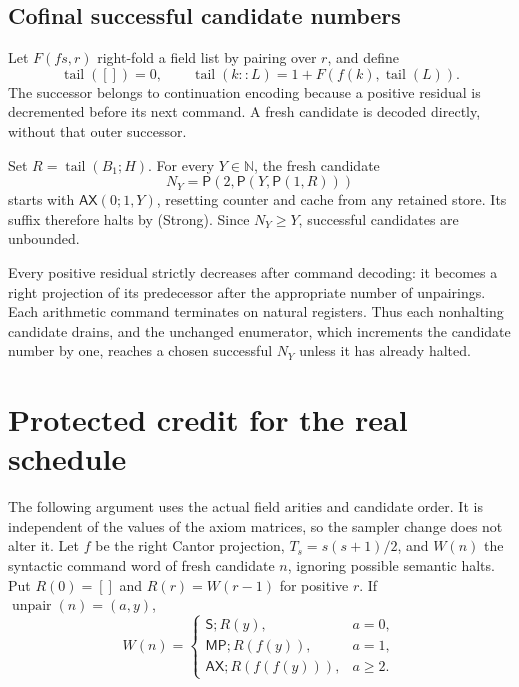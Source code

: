 \documentclass[11pt,a4paper]{article}
\theoremstyle{definition}
\newcommand{\N}{\mathbb N}
\newcommand{\pair}{\mathsf P}
\newcommand{\AX}{\mathsf{AX}}
\newcommand{\MP}{\mathsf{MP}}
\newcommand{\Tr}{\mathsf S}
\numberwithin{equation}{section}
\begin{document}
\subsection{Cofinal successful candidate numbers}

Let $F(fs,r)$ right-fold a field list by pairing over $r$, and define
\[
 \operatorname{tail}([])=0,\qquad
 \operatorname{tail}(k::L)=1+F(f(k),\operatorname{tail}(L)).
\]
The successor belongs to continuation encoding because a positive
residual is decremented before its next command. A fresh candidate is
decoded directly, without that outer successor.

Set $R=\operatorname{tail}(B_1;H)$. For every $Y\in\N$, the fresh
candidate
\begin{equation}
 N_Y=\pair(2,\pair(Y,\pair(1,R)))
 \label{eq:cofinal}
\end{equation}
starts with $\AX(0;1,Y)$, resetting counter and cache from any retained
store. Its suffix therefore halts by (Strong). Since $N_Y\ge Y$,
successful candidates are unbounded.

Every positive residual strictly decreases after command decoding:
it becomes a right projection of its predecessor after the appropriate
number of unpairings. Each arithmetic command terminates on natural
registers. Thus each nonhalting candidate drains, and the unchanged
enumerator, which increments the candidate number by one, reaches a
chosen successful $N_Y$ unless it has already halted.

\section{Protected credit for the real schedule}
\label{sec:credit}

The following argument uses the actual field arities and candidate
order. It is independent of the values of the axiom matrices, so the
sampler change does not alter it. Let $f$ be the right Cantor projection,
$T_s=s(s+1)/2$, and $W(n)$ the syntactic command word of fresh candidate
$n$, ignoring possible semantic halts. Put $R(0)=[]$ and
$R(r)=W(r-1)$ for positive $r$. If $\operatorname{unpair}(n)=(a,y)$,
\begin{equation}
 W(n)=
 \begin{cases}
 \Tr;R(y),&a=0,\\
 \MP;R(f(y)),&a=1,\\
 \AX;R(f(f(y))),&a\ge2.
 \end{cases}
 \label{eq:schedule}
\end{equation}
\end{document}
